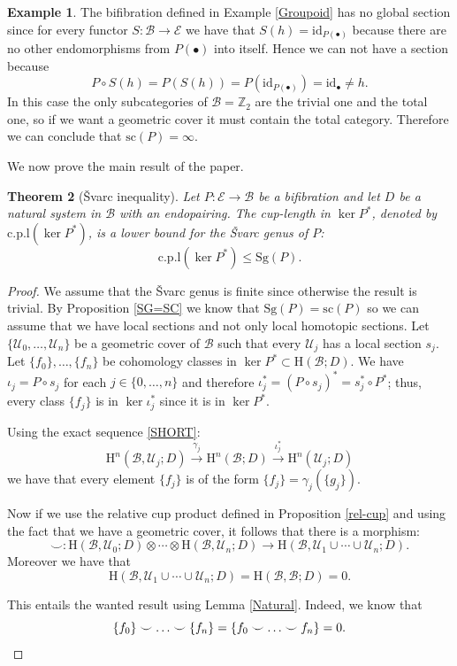 \documentclass[12pt,reqno]{amsart}
\newtheorem{teo}{Theorem}[section]
\theoremstyle{definition}
\newtheorem{example}[teo]{Example}
\theoremstyle{remark}
\numberwithin{figure}{section}%
\newcommand{\Ba}{\mathcal{B}}
\newcommand{\co}{\colon}
\newcommand{\Ho}{\mathrm{H}}
\newcommand{\E}{\mathcal{E}}
\newcommand{\id}{\mathrm{id}}
\newcommand{\sC}{\mathrm{sc}}
\newcommand{\sG}{\mathrm{Sg}}
\newcommand{\Uc}{\mathcal{U}}
\newcommand{\cpl}{\mathrm{c.p.l}}
\begin{document}
\begin{example}
The bifibration defined in Example \ref{Groupoid}
has no global section since for every functor $S \colon \Ba \rightarrow \E$ we have that $S(h)=\id_{P(\bullet)}$ because there are no other endomorphisms from $P(\bullet)$ into itself. Hence we can not have a section because
$$P\circ S(h)=P(S(h))=P(\id_{P(\bullet)})=\id_\bullet \neq h.$$
In this case the only subcategories of $\Ba=\mathbb{Z}_2$ are the trivial one and the total one, so if we want a geometric cover it must contain the total category. Therefore we can conclude that $\sC(P)=\infty$. 
\end{example}


 We now prove the main result of the paper.

\begin{teo}[\v{S}varc inequality]\label{thm:main_thm}
Let $P \colon \E \rightarrow \Ba$ be a bifibration and let $D$ be a natural system in $\Ba$ with an endopairing. The cup-length in $\ker{P^*}$, denoted by $\cpl(\ker{P^*})$, is a lower bound for the \v{S}varc genus of $P$:  $$\cpl (\ker{P^*}) \leq \sG(P).$$
\end{teo}

\begin{proof}
    We assume that the \v{S}varc genus is finite since otherwise the result is trivial. By Proposition \ref{SG=SC} we know that $\sG(P)=\sC(P)$ so we can assume that we have local sections and not only local homotopic sections. Let $\{\Uc_0,\ldots,\Uc_n\}$ be a geometric cover of $\Ba$ such that every $\Uc_j$ has a local section $s_j$.   Let $\{f_0\},\ldots,\{f_n\}$ be cohomology classes in $\ker P^* \subset \Ho(\Ba;D)$. We  have  $\iota_j=P\circ s_j$  for each $j \in\{0,\ldots,n\}$ and therefore $\iota_j^*=(P\circ s_j)^*=s_j^* \circ P^*$; thus, every class $\{f_j\}$ is in $\ker \iota_j^*$ since it is in $\ker P^*$.

    Using the exact sequence  \eqref{SHORT}:
    $$\Ho^n(\Ba,\Uc_j;D) \xrightarrow{\gamma_j} \Ho^n(\Ba;D) \xrightarrow{\iota_j^*} \Ho^n(\Uc_j;D)$$
we have that every element $\{f_j\}$ is of the form $\{f_j\}=\gamma_j(\{g_j\})$.

    Now if we use the relative cup product defined in Proposition \ref{rel-cup} and using the fact that we have a geometric cover, it follows  that there is a morphism:
    $$\smile\co \Ho(\Ba,\Uc_0;D) \otimes \cdots \otimes \Ho(\Ba,\Uc_n;D) \rightarrow \Ho(\Ba, \Uc_1 \cup \cdots \cup \Uc_n;D).$$
    Moreover we have that $$\Ho(\Ba, \Uc_1 \cup \cdots \cup \Uc_n;D)=\Ho(\Ba,\Ba;D)=0.$$
    
    This entails the wanted result using Lemma \ref{Natural}. Indeed, we know that $$\{f_0\}\smile \ldots \smile \{f_n\}=\{f_0\smile \ldots \smile f_n\}=0.\qedhere$$ 
\end{proof}
\end{document}
